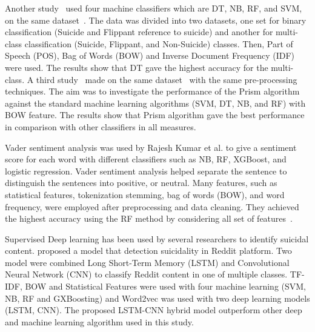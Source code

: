 \documentclass[11pt]{article}
\begin{document}
Another study~\cite{33n8527039} used four machine classifiers which are DT, NB, RF, and SVM, on the same dataset~\cite{32n10.1145/2700171.2791023}. The data was divided into two datasets, one set for binary classification (Suicide and Flippant reference to suicide) and another for multi-class classification (Suicide, Flippant, and Non-Suicide) classes. Then, Part of Speech (POS), Bag of Words (BOW) and Inverse Document Frequency (IDF) were used. The results show that DT gave the highest accuracy for the multi-class.
A third study~\cite{34n8527032} made on the same dataset~\cite{32n10.1145/2700171.2791023} with the same pre-processing techniques. The aim was to investigate the performance of the Prism algorithm against the standard machine learning algorithms (SVM, DT, NB, and RF) with BOW feature. The results show that Prism algorithm %
gave the best performance in comparison with other classifiers in all measures.

Vader sentiment analysis was used by Rajesh Kumar et al. to give a sentiment score for each word with different classifiers such as NB, RF, XGBoost, and logistic regression. Vader sentiment analysis helped separate the sentence to distinguish the sentences into positive, or neutral. Many features, such as statistical features, tokenization stemming, bag of words (BOW), and word frequency, were employed after preprocessing and data cleaning. They achieved the highest accuracy using the RF method by considering all set of features~\cite{22rajesh2020suicidal}.


Supervised Deep learning has been used by several researchers to identify suicidal content. \citet{25na13010007} proposed a model that detection suicidality in Reddit platform. Two model were combined Long Short-Term Memory (LSTM) and Convolutional Neural Network (CNN) to classify Reddit content in one of multiple classes. TF-IDF, BOW and Statistical Features were used with four machine learning (SVM, NB, RF and GXBoosting) and Word2vec was used with two deep learning models (LSTM, CNN). The proposed LSTM-CNN hybrid model outperform other deep and machine learning algorithm used in this study. %
\end{document}
